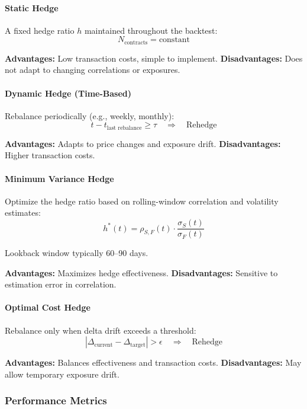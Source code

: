 \paragraph{Static Hedge}

A fixed hedge ratio $h$ maintained throughout the backtest:
\[
N_{\text{contracts}} = \text{constant}
\]

\textbf{Advantages:} Low transaction costs, simple to implement.
\textbf{Disadvantages:} Does not adapt to changing correlations or exposures.

\paragraph{Dynamic Hedge (Time-Based)}

Rebalance periodically (e.g., weekly, monthly):
\[
t - t_{\text{last rebalance}} \geq \tau \quad \Rightarrow \quad \text{Rehedge}
\]

\textbf{Advantages:} Adapts to price changes and exposure drift.
\textbf{Disadvantages:} Higher transaction costs.

\paragraph{Minimum Variance Hedge}

Optimize the hedge ratio based on rolling-window correlation and volatility estimates:
\[
h^*(t) = \rho_{S,F}(t) \cdot \frac{\sigma_S(t)}{\sigma_F(t)}
\]

Lookback window typically 60--90 days.

\textbf{Advantages:} Maximizes hedge effectiveness.
\textbf{Disadvantages:} Sensitive to estimation error in correlation.

\paragraph{Optimal Cost Hedge}

Rebalance only when delta drift exceeds a threshold:
\[
|\Delta_{\text{current}} - \Delta_{\text{target}}| > \epsilon \quad \Rightarrow \quad \text{Rehedge}
\]

\textbf{Advantages:} Balances effectiveness and transaction costs.
\textbf{Disadvantages:} May allow temporary exposure drift.

\subsubsection{Performance Metrics}

